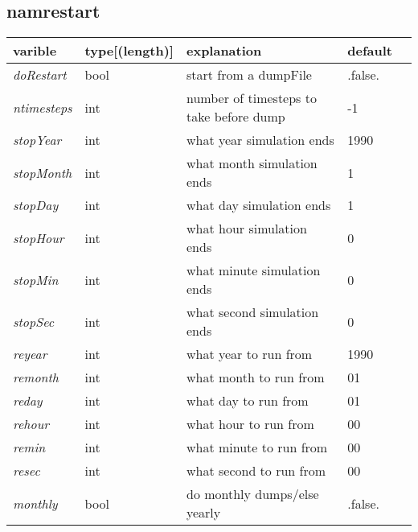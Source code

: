 \documentclass{article}
\begin{document}
\subsection{namrestart}
\begin{tabular}{|l|l|l|l|l|}
  \hline
  varible & type[(length)] & explanation & default\\
  \hline
  \hline
  \emph{doRestart} & bool & start from a dumpFile & .false. \\
  \emph{ntimesteps} & int & number of timesteps to take before dump & -1 \\
  \emph{stopYear} & int & what year simulation ends & 1990 \\
  \emph{stopMonth} & int & what month simulation ends & 1 \\
  \emph{stopDay} & int & what day simulation ends & 1 \\
  \emph{stopHour} & int & what hour simulation ends & 0 \\
  \emph{stopMin} & int & what minute simulation ends & 0 \\
  \emph{stopSec} & int & what second simulation ends & 0 \\

  \emph{reyear} & int & what year to run from & 1990 \\
  \emph{remonth} & int & what month to run from & 01 \\
  \emph{reday} & int & what day to run from & 01 \\
  \emph{rehour} & int & what hour to run from & 00\\
  \emph{remin} & int & what minute to run from & 00\\
  \emph{resec} & int & what second to run from & 00\\
  \emph{monthly} & bool & do monthly dumps/else yearly & .false. \\
  \hline
\end{tabular}
\end{document}
